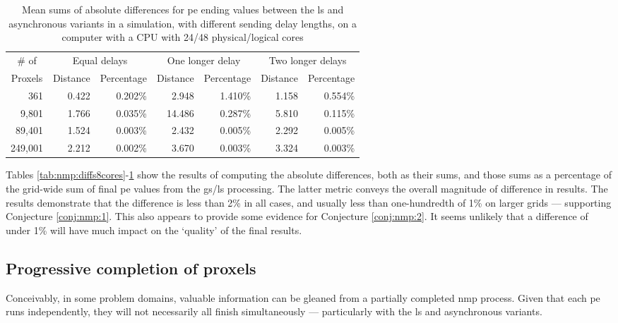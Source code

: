 \begin{table}
\centering
\begin{tabular}{@{}r|rr|rr|rr@{}}
\toprule
\multicolumn{1}{c|}{\# of}   & \multicolumn{2}{c|}{Equal delays} & \multicolumn{2}{c|}{One longer delay} & \multicolumn{2}{c}{Two longer delays} \\ \cmidrule(l){2-7} 
\multicolumn{1}{c|}{Proxels} & Distance     & Percentage     & Distance      & Percentage      & Distance      & Percentage      \\ \midrule
361  & 0.422 & 0.202\% & 2.948 & 1.410\% & 1.158 & 0.554\% \\
9,801  & 1.766 & 0.035\% & 14.486 & 0.287\% & 5.810 & 0.115\% \\
89,401  & 1.524 & 0.003\% & 2.432 & 0.005\% & 2.292 & 0.005\% \\
249,001  & 2.212 & 0.002\% & 3.670 & 0.003\% & 3.324 & 0.003\% \\ \bottomrule
\end{tabular}%
\caption[Mean sums of absolute differences for \acrshort{pe} ending values between the \gls{ls} and asynchronous variants on a 48-core CPU]{Mean sums of absolute differences for \gls{pe} ending values between the \gls{ls} and asynchronous variants in a simulation, with different sending delay lengths, on a computer with a CPU with 24/48 physical/logical cores}
\label{tab:nmp:diffs48cores}
\end{table}

Tables \ref{tab:nmp:diffs8cores}-\ref{tab:nmp:diffs48cores} show the results of computing the absolute differences, both as their sums, and those sums as a percentage of the grid-wide sum of final \gls{pe} values from the \gls{gs}/\gls{ls} processing.  The latter metric conveys the overall magnitude of difference in results.  The results demonstrate that the difference is less than 2\% in all cases, and usually less than one-hundredth of 1\% on larger grids --- supporting Conjecture \ref{conj:nmp:1}.  This also appears to provide some evidence for Conjecture \ref{conj:nmp:2}.  It seems unlikely that a difference of under 1\% will have much impact on the `quality' of the final results.

\subsection{Progressive completion of proxels}
Conceivably, in some problem domains, valuable information can be gleaned from a partially completed \gls{nmp} process.  Given that each \gls{pe} runs independently, they will not necessarily all finish simultaneously --- particularly with the \gls{ls} and asynchronous variants.

